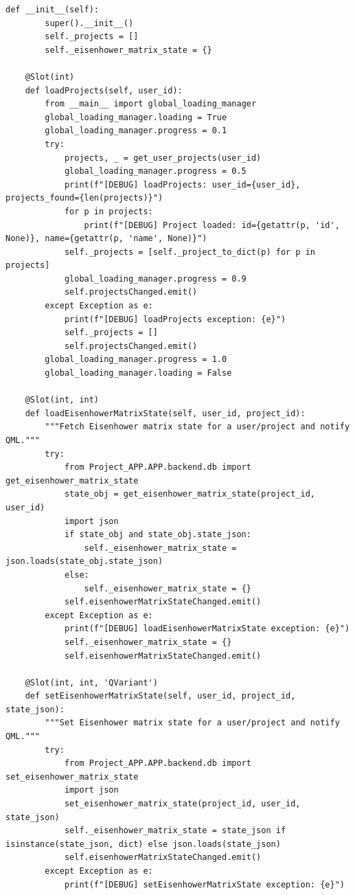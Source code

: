 \documentclass{report}
\begin{document}
\begin{lstlisting}[style=pythonstyle]
    def __init__(self):
        super().__init__()
        self._projects = []
        self._eisenhower_matrix_state = {}

    @Slot(int)
    def loadProjects(self, user_id):
        from __main__ import global_loading_manager
        global_loading_manager.loading = True
        global_loading_manager.progress = 0.1
        try:
            projects, _ = get_user_projects(user_id)
            global_loading_manager.progress = 0.5
            print(f"[DEBUG] loadProjects: user_id={user_id}, projects_found={len(projects)}")
            for p in projects:
                print(f"[DEBUG] Project loaded: id={getattr(p, 'id', None)}, name={getattr(p, 'name', None)}")
            self._projects = [self._project_to_dict(p) for p in projects]
            global_loading_manager.progress = 0.9
            self.projectsChanged.emit()
        except Exception as e:
            print(f"[DEBUG] loadProjects exception: {e}")
            self._projects = []
            self.projectsChanged.emit()
        global_loading_manager.progress = 1.0
        global_loading_manager.loading = False

    @Slot(int, int)
    def loadEisenhowerMatrixState(self, user_id, project_id):
        """Fetch Eisenhower matrix state for a user/project and notify QML."""
        try:
            from Project_APP.APP.backend.db import get_eisenhower_matrix_state
            state_obj = get_eisenhower_matrix_state(project_id, user_id)
            import json
            if state_obj and state_obj.state_json:
                self._eisenhower_matrix_state = json.loads(state_obj.state_json)
            else:
                self._eisenhower_matrix_state = {}
            self.eisenhowerMatrixStateChanged.emit()
        except Exception as e:
            print(f"[DEBUG] loadEisenhowerMatrixState exception: {e}")
            self._eisenhower_matrix_state = {}
            self.eisenhowerMatrixStateChanged.emit()

    @Slot(int, int, 'QVariant')
    def setEisenhowerMatrixState(self, user_id, project_id, state_json):
        """Set Eisenhower matrix state for a user/project and notify QML."""
        try:
            from Project_APP.APP.backend.db import set_eisenhower_matrix_state
            import json
            set_eisenhower_matrix_state(project_id, user_id, state_json)
            self._eisenhower_matrix_state = state_json if isinstance(state_json, dict) else json.loads(state_json)
            self.eisenhowerMatrixStateChanged.emit()
        except Exception as e:
            print(f"[DEBUG] setEisenhowerMatrixState exception: {e}")


\end{lstlisting}
\end{document}
